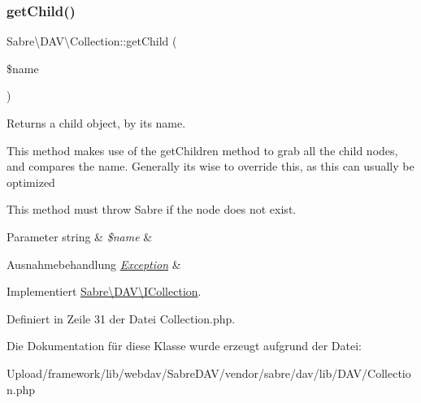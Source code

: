 \subsubsection{\texorpdfstring{get\+Child()}{getChild()}}
{\footnotesize\ttfamily Sabre\textbackslash{}\+D\+A\+V\textbackslash{}\+Collection\+::get\+Child (\begin{DoxyParamCaption}\item[{}]{\$name }\end{DoxyParamCaption})}

Returns a child object, by its name.

This method makes use of the get\+Children method to grab all the child nodes, and compares the name. Generally its wise to override this, as this can usually be optimized

This method must throw Sabre if the node does not exist.


\begin{DoxyParams}[1]{Parameter}
string & {\em \$name} & \\
\hline
\end{DoxyParams}

\begin{DoxyExceptions}{Ausnahmebehandlung}
{\em \mbox{\hyperlink{class_sabre_1_1_d_a_v_1_1_exception}{Exception}}} & \\
\hline
\end{DoxyExceptions}


Implementiert \mbox{\hyperlink{interface_sabre_1_1_d_a_v_1_1_i_collection_a09f82b07550611752abb149f468b89c2}{Sabre\textbackslash{}\+D\+A\+V\textbackslash{}\+I\+Collection}}.



Definiert in Zeile 31 der Datei Collection.\+php.



Die Dokumentation für diese Klasse wurde erzeugt aufgrund der Datei\+:\begin{DoxyCompactItemize}
\item 
Upload/framework/lib/webdav/\+Sabre\+D\+A\+V/vendor/sabre/dav/lib/\+D\+A\+V/Collection.\+php\end{DoxyCompactItemize}
